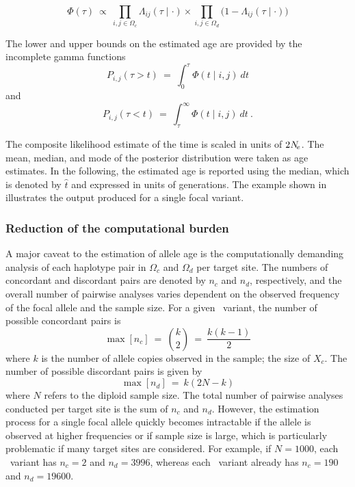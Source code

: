 \begin{equation}\label{eq:compll}
	\Phi(\tau)
	~\propto~
	\prod_{i,j \in \Omega_c} \Lambda_{ij}(\tau\mid\cdot)
	\times
	\prod_{i,j \in \Omega_d} \big(1 - \Lambda_{ij}(\tau\mid\cdot) \big)
\end{equation}

The lower and upper bounds on the estimated age are provided by the incomplete gamma functions
\begin{equation}
	P_{i,j}(\tau > t) ~=~ \int_{0}^{\tau} \Phi(t \mid i,j) ~dt
\end{equation}
and
\begin{equation}
	P_{i,j}(\tau < t) ~=~ \int_{\tau}^{\infty} \Phi(t \mid i,j) ~dt \ .
\end{equation}

%

%

The composite likelihood estimate of the time is scaled in units of ${2 N_{\!e}}$.
The mean, median, and mode of the posterior distribution were taken as age estimates.
In the following, the estimated age is reported using the median, which is denoted by $\hat{t}$ and expressed in units of generations.
The example shown in  illustrates the output produced for a single focal variant.


%
\subsubsection{Reduction of the computational burden}
%

A major caveat to the estimation of allele age is the computationally demanding analysis of each haplotype pair in $\Omega_c$ and $\Omega_d$ per target site.
The numbers of concordant and discordant pairs are denoted by $n_c$ and $n_d$, respectively, and the overall number of pairwise analyses varies dependent on the observed frequency of the focal allele and the sample size.
For a given \fk{}~variant, the number of possible concordant pairs is
\begin{equation}\label{eq:age_nc}
	\max[n_c] ~=~ {{k}\choose{2}} ~=~ \frac{k(k-1)}{2}
\end{equation}
where $k$ is the number of allele copies observed in the sample; \ie the size of $X_c$.
The number of possible discordant pairs is given by
\begin{equation}\label{eq:age_nd}
	\max[n_d] ~=~ k(2N-k)
\end{equation}
where $N$ refers to the diploid sample size.
The total number of pairwise analyses conducted per target site is the sum of $n_c$ and $n_d$.
However, the estimation process for a single focal allele quickly becomes intractable if the allele is observed at higher frequencies or if sample size is large, which is particularly problematic if many target sites are considered.
For example, if ${N=\num{1000}}$, each ~variant has ${n_c=2}$ and ${n_d=\num{3996}}$, whereas each ~variant already has ${n_c=\num{190}}$ and ${n_d=\num{19600}}$.

